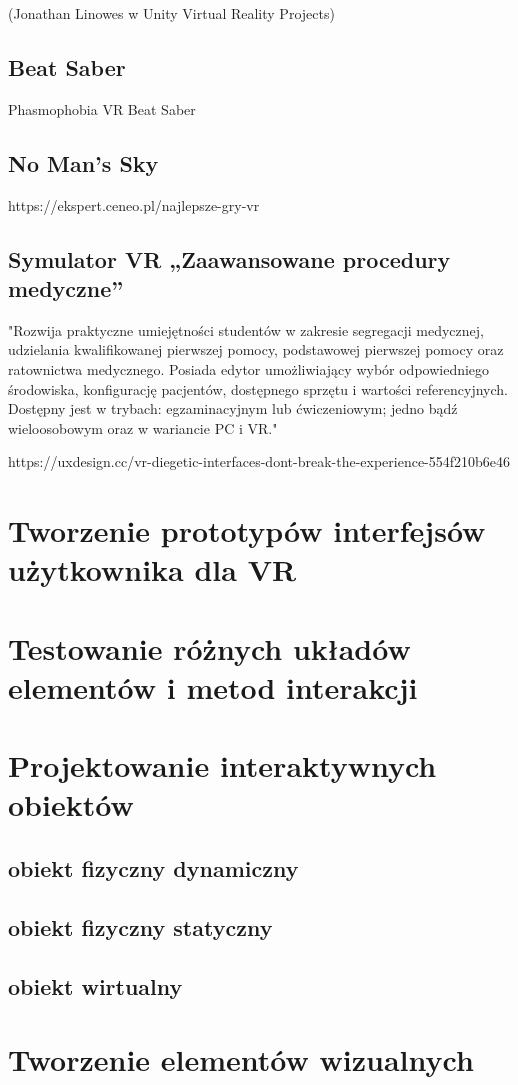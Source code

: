 (Jonathan Linowes w Unity Virtual Reality Projects)



\subsection{Beat Saber}
Phasmophobia VR
Beat Saber

\subsection{No Man's Sky}

https://ekspert.ceneo.pl/najlepsze-gry-vr


\subsection{Symulator VR „Zaawansowane procedury medyczne”
}
"Rozwija praktyczne umiejętności studentów w zakresie segregacji medycznej, udzielania kwalifikowanej pierwszej pomocy, podstawowej pierwszej pomocy oraz ratownictwa medycznego. Posiada edytor umożliwiający wybór odpowiedniego środowiska, konfigurację pacjentów, dostępnego sprzętu i wartości referencyjnych. Dostępny jest w trybach: egzaminacyjnym lub ćwiczeniowym; jedno bądź wieloosobowym oraz w wariancie PC i VR."



https://uxdesign.cc/vr-diegetic-interfaces-dont-break-the-experience-554f210b6e46


\section{Tworzenie prototypów interfejsów użytkownika dla VR}
\section{Testowanie różnych układów elementów i metod interakcji}
\section{Projektowanie interaktywnych obiektów}
\subsection{obiekt fizyczny dynamiczny}
\subsection{obiekt fizyczny statyczny}
\subsection{obiekt wirtualny}
\section{Tworzenie elementów wizualnych}



